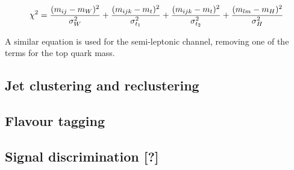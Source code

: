 \begin{equation}
  \centering
	\chi^2 = \frac{(m_{ij} - m_W)^2}{\sigma^2_W} + \frac{(m_{ijk} - m_t)^2}{\sigma^2_{t_1}} + \frac{(m_{ijk} - m_t)^2}{\sigma^2_{t_2}} + \frac{(m_{lm} - m_H)^2}{\sigma^2_H}
\label{eq:chi-square}
\end{equation}

A similar equation is used for the semi-leptonic channel, removing one of the terms for the top quark mass.

\subsection{Jet clustering and reclustering}

\subsection{Flavour tagging}

\subsection{Signal discrimination [?]}







%
%

